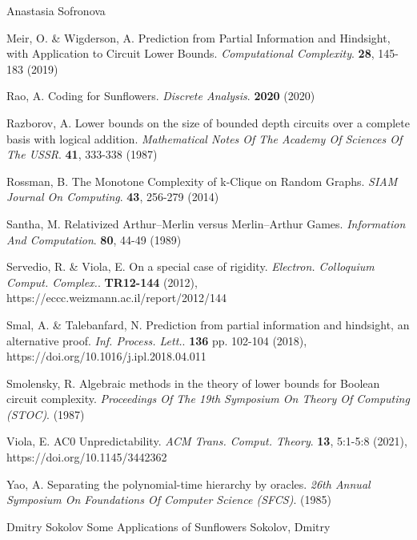 \documentclass[report]{owrart}
\begin{document}
\begin{report}
\begin{talk}{Anastasia Sofronova}
\begin{thebibliography}{99}
  Meir, O. \& Wigderson, A. Prediction from Partial Information and Hindsight, with Application to Circuit Lower Bounds. {\em Computational Complexity}. \textbf{28}, 145-183 (2019)
  
  Rao, A. Coding for Sunflowers. {\em Discrete Analysis}. \textbf{2020} (2020)
  
  Razborov, A. Lower bounds on the size of bounded depth circuits over a complete basis with logical addition. {\em Mathematical Notes Of The Academy Of Sciences Of The USSR}. \textbf{41}, 333-338 (1987)
  
  Rossman, B. The Monotone Complexity of k-Clique on Random Graphs. {\em SIAM Journal On Computing}. \textbf{43}, 256-279 (2014)
  
  Santha, M. Relativized Arthur–Merlin versus Merlin–Arthur Games. {\em Information And Computation}. \textbf{80}, 44-49 (1989)
  
  Servedio, R. \& Viola, E. On a special case of rigidity. {\em Electron. Colloquium Comput. Complex.}. \textbf{TR12-144} (2012), https://eccc.weizmann.ac.il/report/2012/144
  
  Smal, A. \& Talebanfard, N. Prediction from partial information and hindsight, an alternative proof. {\em Inf. Process. Lett.}. \textbf{136} pp. 102-104 (2018), https://doi.org/10.1016/j.ipl.2018.04.011
  
  Smolensky, R. Algebraic methods in the theory of lower bounds for Boolean circuit complexity. {\em Proceedings Of The 19th Symposium On Theory Of Computing (STOC)}. (1987)
  
  Viola, E. AC0 Unpredictability. {\em ACM Trans. Comput. Theory}. \textbf{13}, 5:1-5:8 (2021), https://doi.org/10.1145/3442362
  
  Yao, A. Separating the polynomial-time hierarchy by oracles. {\em 26th Annual Symposium On Foundations Of Computer Science (SFCS)}. (1985)
  
  
  
  \end{thebibliography}
  
  \end{talk}



\begin{talk}{Dmitry Sokolov}
  {Some Applications of Sunflowers}
  {Sokolov, Dmitry}


\end{talk}
\end{report}
\end{document}
